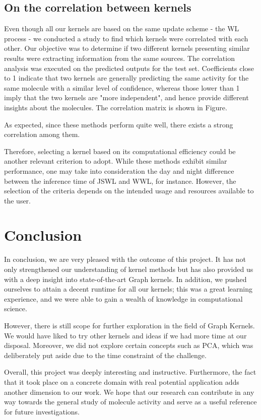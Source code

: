 \documentclass{IEEEtran}
\begin{document}
\subsection{On the correlation between kernels}

Even though all our kernels are based on the same update scheme - the WL process -
we conducted a study to find which kernels were correlated with each other.
Our objective was to determine if two different kernels presenting similar results
were extracting information from the same sources.
The correlation analysis was executed on the predicted outputs for the test set.
Coefficients close to 1 indicate that two kernels are generally predicting
the same activity for the same molecule with a similar level of confidence,
whereas those lower than 1 imply that the two kernels are "more independent",
and hence provide different insights about the molecules.
The correlation matrix is shown in Figure.

As expected, since these methods perform quite well,
there exists a strong correlation among them.

Therefore, selecting a kernel based on its computational efficiency could be another relevant
criterion to adopt. While these methods exhibit similar performance,
one may take into consideration the day and night difference between the inference time of JSWL and WWL,
for instance.
However, the selection of the criteria depends on the intended usage and resources available to the user.

\section{Conclusion}

In conclusion, we are very pleased with the outcome of this project.
It has not only strengthened our understanding of kernel methods
but has also provided us with a deep insight into state-of-the-art Graph kernels.
In addition, we pushed ourselves to attain a decent runtime for all our kernels;
this was a great learning experience, and we were able to gain a wealth of knowledge in computational science.

However, there is still scope for further exploration in the field of Graph Kernels.
We would have liked to try other kernels and ideas if we had more time at our disposal.
Moreover, we did not explore certain concepts such as PCA, which was deliberately put aside due to the time constraint of the challenge.

Overall, this project was deeply interesting and instructive.
Furthermore, the fact that it took place on a concrete domain
with real potential application adds another dimension to our work.
We hope that our research can contribute in any way towards the general study of molecule activity
and serve as a useful reference for future investigations.
\end{document}
